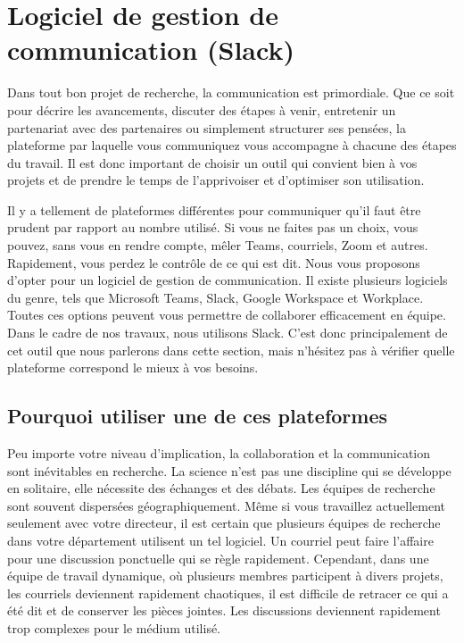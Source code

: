 \documentclass[
  letterpaper,
]{scrbook}
\begin{document}
\hypertarget{logiciel-de-gestion-de-communication-slack}{%
\section{Logiciel de gestion de communication
(Slack)}\label{logiciel-de-gestion-de-communication-slack}}

Dans tout bon projet de recherche, la communication est primordiale. Que
ce soit pour décrire les avancements, discuter des étapes à venir,
entretenir un partenariat avec des partenaires ou simplement structurer
ses pensées, la plateforme par laquelle vous communiquez vous accompagne
à chacune des étapes du travail. Il est donc important de choisir un
outil qui convient bien à vos projets et de prendre le temps de
l'apprivoiser et d'optimiser son utilisation.

Il y a tellement de plateformes différentes pour communiquer qu'il faut
être prudent par rapport au nombre utilisé. Si vous ne faites pas un
choix, vous pouvez, sans vous en rendre compte, mêler Teams, courriels,
Zoom et autres. Rapidement, vous perdez le contrôle de ce qui est dit.
Nous vous proposons d'opter pour un logiciel de gestion de
communication. Il existe plusieurs logiciels du genre, tels que
Microsoft Teams, Slack, Google Workspace et Workplace. Toutes ces
options peuvent vous permettre de collaborer efficacement en équipe.
Dans le cadre de nos travaux, nous utilisons Slack. C'est donc
principalement de cet outil que nous parlerons dans cette section, mais
n'hésitez pas à vérifier quelle plateforme correspond le mieux à vos
besoins.

\hypertarget{pourquoi-utiliser-une-de-ces-plateformes}{%
\subsection{Pourquoi utiliser une de ces
plateformes}\label{pourquoi-utiliser-une-de-ces-plateformes}}

Peu importe votre niveau d'implication, la collaboration et la
communication sont inévitables en recherche. La science n'est pas une
discipline qui se développe en solitaire, elle nécessite des échanges et
des débats. Les équipes de recherche sont souvent dispersées
géographiquement. Même si vous travaillez actuellement seulement avec
votre directeur, il est certain que plusieurs équipes de recherche dans
votre département utilisent un tel logiciel. Un courriel peut faire
l'affaire pour une discussion ponctuelle qui se règle rapidement.
Cependant, dans une équipe de travail dynamique, où plusieurs membres
participent à divers projets, les courriels deviennent rapidement
chaotiques, il est difficile de retracer ce qui a été dit et de
conserver les pièces jointes. Les discussions deviennent rapidement trop
complexes pour le médium utilisé.
\end{document}
